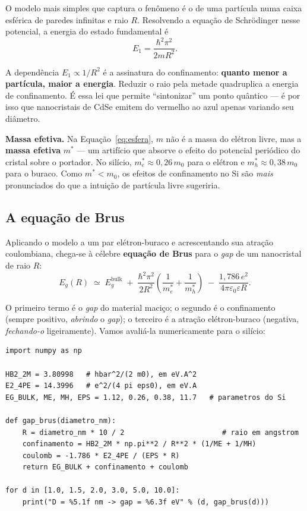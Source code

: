 O modelo mais simples que captura o fenômeno é o de uma partícula numa caixa
esférica de paredes infinitas e raio $R$. Resolvendo a equação de Schrödinger
nesse potencial, a energia do estado fundamental é
\begin{equation}
  E_1 = \frac{\hbar^2 \pi^2}{2 m R^2}.
  \label{eq:esfera}
\end{equation}

\noindent
A dependência $E_1 \propto 1/R^2$ é a assinatura do confinamento: \textbf{quanto
menor a partícula, maior a energia}. Reduzir o raio pela metade quadruplica a
energia de confinamento. É essa lei que permite ``sintonizar'' um ponto quântico
--- é por isso que nanocristais de CdSe emitem do vermelho ao azul apenas variando
seu diâmetro.

\begin{caixanota}
\textbf{Massa efetiva.} Na Equação~\ref{eq:esfera}, $m$ não é a massa do elétron
livre, mas a \textbf{massa efetiva} $m^*$ --- um artifício que absorve o efeito do
potencial periódico do cristal sobre o portador. No silício, $m^*_e \approx
0{,}26\,m_0$ para o elétron e $m^*_h \approx 0{,}38\,m_0$ para o buraco. Como $m^*
< m_0$, os efeitos de confinamento no Si são \emph{mais} pronunciados do que a
intuição de partícula livre sugeriria.
\end{caixanota}

\subsection{A equação de Brus}

Aplicando o modelo a um par elétron-buraco e acrescentando sua atração
coulombiana, chega-se à célebre \textbf{equação de Brus} para o \emph{gap} de um
nanocristal de raio $R$:
\begin{equation}
  E_g(R) \;\simeq\; E_g^{\text{bulk}}
  \;+\; \frac{\hbar^2\pi^2}{2R^2}\left(\frac{1}{m^*_e}+\frac{1}{m^*_h}\right)
  \;-\; \frac{1{,}786\,e^2}{4\pi\varepsilon_0 \varepsilon R}.
  \label{eq:brus}
\end{equation}

\noindent
O primeiro termo é o \emph{gap} do material maciço; o segundo é o confinamento
(sempre positivo, \emph{abrindo} o \emph{gap}); o terceiro é a atração
elétron-buraco (negativa, \emph{fechando-o} ligeiramente). Vamos avaliá-la
numericamente para o silício:

\begin{lstlisting}[style=python,caption={A equação de Brus aplicada ao silício.},label={lst:brus}]
import numpy as np

HB2_2M = 3.80998   # hbar^2/(2 m0), em eV.A^2
E2_4PE = 14.3996   # e^2/(4 pi eps0), em eV.A
EG_BULK, ME, MH, EPS = 1.12, 0.26, 0.38, 11.7   # parametros do Si

def gap_brus(diametro_nm):
    R = diametro_nm * 10 / 2                       # raio em angstrom
    confinamento = HB2_2M * np.pi**2 / R**2 * (1/ME + 1/MH)
    coulomb = -1.786 * E2_4PE / (EPS * R)
    return EG_BULK + confinamento + coulomb

for d in [1.0, 1.5, 2.0, 3.0, 5.0, 10.0]:
    print("D = %5.1f nm -> gap = %6.3f eV" % (d, gap_brus(d)))
\end{lstlisting}


